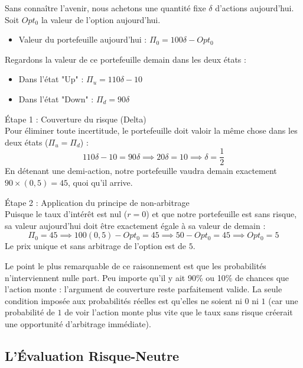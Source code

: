 Sans connaître l'avenir, nous achetons une quantité fixe $\delta$ d'actions aujourd'hui. Soit $Opt_0$ la valeur de l'option aujourd'hui.
\begin{itemize}[label=$\rightarrow$]
    \item Valeur du portefeuille aujourd'hui : $\Pi_0 = 100\delta - Opt_0$
\end{itemize}
Regardons la valeur de ce portefeuille demain dans les deux états :
\begin{itemize}[label=$\rightarrow$]
    \item Dans l'état "Up" : $\Pi_u = 110\delta - 10$
    \item Dans l'état "Down" : $\Pi_d = 90\delta$
\end{itemize}

Étape 1 : Couverture du risque (Delta)\\
Pour éliminer toute incertitude, le portefeuille doit valoir la même chose dans les deux états ($\Pi_u = \Pi_d$) :
\begin{equation}
    \label{eq:fsec3-couverture_delta}
    110\delta - 10 = 90\delta \implies 20\delta = 10 \implies \delta = \frac{1}{2}
\end{equation}
En détenant une demi-action, notre portefeuille vaudra demain exactement $90 \times (0,5) = 45$, quoi qu'il arrive.

Étape 2 : Application du principe de non-arbitrage\\
Puisque le taux d'intérêt est nul ($r=0$) et que notre portefeuille est sans risque, sa valeur aujourd'hui doit être exactement égale à sa valeur de demain :
\begin{equation}
    \label{eq:fsec3-couverture_prix}
    \Pi_0 = 45 \implies 100(0,5) - Opt_0 = 45 \implies 50 - Opt_0 = 45 \implies Opt_0 = 5
\end{equation}
Le prix unique et sans arbitrage de l'option est de $5$.

Le point le plus remarquable de ce raisonnement est que les probabilités n'interviennent nulle part. Peu importe qu'il y ait 90\% ou 10\% de chances que l'action monte : l'argument de couverture reste parfaitement valide. La seule condition imposée aux probabilités réelles est qu'elles ne soient ni $0$ ni $1$ (car une probabilité de $1$ de voir l'action monte plus vite que le taux sans risque créerait une opportunité d'arbitrage immédiate).



\subsection{L'Évaluation Risque-Neutre}

